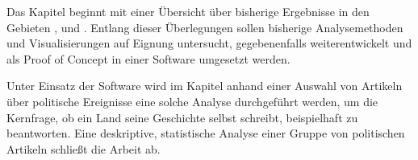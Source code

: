 
Das Kapitel  beginnt mit einer Übersicht über bisherige Ergebnisse in den Gebieten ,  und .
Entlang dieser Überlegungen sollen bisherige Analysemethoden und Visualisierungen auf Eignung untersucht, gegebenenfalls weiterentwickelt und als Proof of Concept in einer Software umgesetzt werden.


Unter Einsatz der Software wird im Kapitel  anhand einer Auswahl von Artikeln über politische Ereignisse eine solche Analyse durchgeführt werden, um die Kernfrage, ob ein Land seine Geschichte selbst schreibt, beispielhaft zu beantworten. 
Eine deskriptive, statistische Analyse einer Gruppe von politischen Artikeln schließt die Arbeit ab. 

